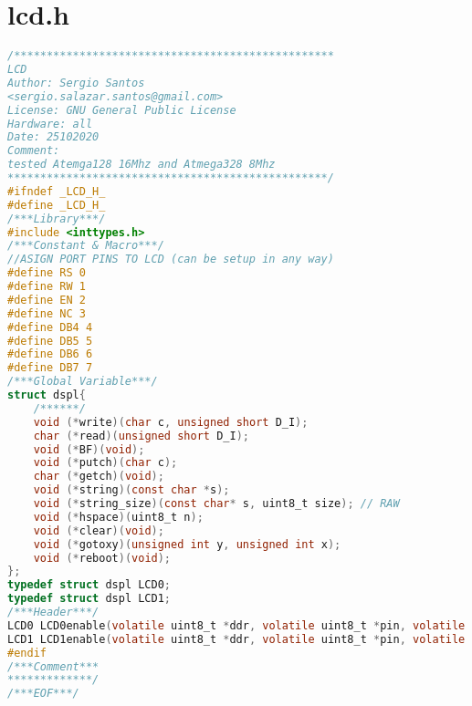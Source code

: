 \chapter{lcd.h}
\begin{lstlisting}[language=C, caption={lcd.h}, label=lcd-h, captionpos=b]
/*************************************************
LCD
Author: Sergio Santos 
<sergio.salazar.santos@gmail.com>
License: GNU General Public License
Hardware: all
Date: 25102020
Comment:
tested Atemga128 16Mhz and Atmega328 8Mhz
*************************************************/
#ifndef _LCD_H_
#define _LCD_H_
/***Library***/
#include <inttypes.h>
/***Constant & Macro***/
//ASIGN PORT PINS TO LCD (can be setup in any way)
#define RS 0
#define RW 1
#define EN 2
#define NC 3
#define DB4 4
#define DB5 5
#define DB6 6
#define DB7 7
/***Global Variable***/
struct dspl{
	/******/
	void (*write)(char c, unsigned short D_I);
	char (*read)(unsigned short D_I);
	void (*BF)(void);
	void (*putch)(char c);
	char (*getch)(void);
	void (*string)(const char *s);
	void (*string_size)(const char* s, uint8_t size); // RAW
	void (*hspace)(uint8_t n);
	void (*clear)(void);
	void (*gotoxy)(unsigned int y, unsigned int x);
	void (*reboot)(void);
};
typedef struct dspl LCD0;
typedef struct dspl LCD1;
/***Header***/
LCD0 LCD0enable(volatile uint8_t *ddr, volatile uint8_t *pin, volatile uint8_t *port);
LCD1 LCD1enable(volatile uint8_t *ddr, volatile uint8_t *pin, volatile uint8_t *port);
#endif
/***Comment***
*************/
/***EOF***/
\end{lstlisting}
